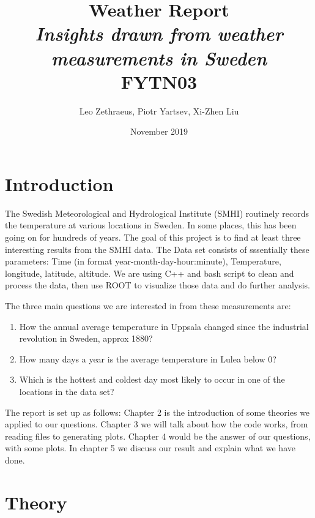 \documentclass[a4paper]{article}
\begin{document}
\usepackage{graphicx}
\title{Weather Report\\\textit{Insights drawn from weather measurements in Sweden} \\ FYTN03}
\author{Leo Zethraeus, 
Piotr Yartsev, Xi-Zhen Liu} %
\date{November 2019} %
\maketitle
\newpage
\tableofcontents

\newpage

\section{Introduction}
The Swedish Meteorological and Hydrological Institute (SMHI) routinely records the temperature at various locations in Sweden. In some places, this has been going on for hundreds of years. The goal of this project is to find at least three interesting results from the SMHI data. The Data set consists of sssentially these parameters: Time (in format year-month-day-hour:minute), Temperature, longitude, latitude, altitude. We are using C++ and bash script to clean and process the data, then use ROOT to visualize those data and do further analysis. 

The three main questions we are interested in from these measurements are:
\begin{enumerate}
\item How the annual average temperature in Uppsala changed since the industrial revolution in Sweden, approx 1880?
\item How many days a year is the average temperature in Lulea below 0?
\item Which is the hottest and coldest day most likely to occur in one of the locations in the data set?
\end{enumerate}
The report is set up as follows: Chapter 2 is the introduction of some theories we applied to our questions. Chapter 3 we will talk about how the code works, from reading files to generating plots. Chapter 4 would be the answer of our questions, with some plots. In chapter 5 we discuss our result and explain what we have done.


\section{Theory}
\end{document}
